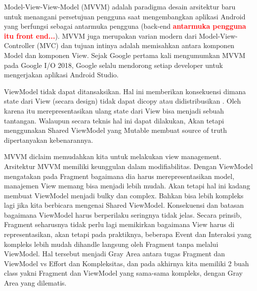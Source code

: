 \documentclass[conference]{IEEEtran}
\begin{document}
\indent Model-View-View-Model (MVVM) adalah paradigma desain arsitektur baru untuk menangani persetujuan pengguna saat mengembangkan aplikasi Android yang berfungsi sebagai antarmuka pengguna (back-end \textbf{\textcolor{red}{antarmuka pengguna itu front end...}}). MVVM juga merupakan varian modern dari Model-View-Controller (MVC) dan tujuan intinya adalah memisahkan antara komponen Model dan komponen View\cite{rasyid2022sistem}. Sejak Google pertama kali mengumumkan MVVM pada Google I/O 2018, Google selalu mendorong setiap developer untuk mengerjakan aplikasi Android Studio.\cite{maulana2022aplikasi}

\indent ViewModel tidak dapat ditansaksikan. Hal ini memberikan konsekuensi dimana state dari View (secara design) tidak dapat dicopy atau didistribusikan \cite{saputro2020implementasi}. Oleh karena itu merepresentasikan ulang state dari View bisa menjadi sebuah tantangan. Walaupun secara teknis hal ini dapat dilakukan, Akan tetapi menggunakan Shared ViewModel yang Mutable membuat source of truth dipertanyakan kebenarannya.

\indent MVVM diclaim memudahkan kita untuk melakukan view management. Arsitektur MVVM memiliki keunggulan dalam modifiabilitas\cite{anhar2024analisis}. Dengan ViewModel mengatakan pada Fragment bagaimana dia harus merepresentasikan model, manajemen View memang bisa menjadi lebih mudah. Akan tetapi hal ini kadang membuat ViewModel menjadi bulky dan complex. Bahkan bisa lebih kompleks lagi jika kita berbicara mengenai Shared ViewModel. Konsekuensi dan batasan bagaimana ViewModel harus berperilaku seringnya tidak jelas. Secara prinsib, Fragment seharusnya tidak perlu lagi memikirkan bagaimana View harus di representasikan, akan tetapi pada praktiknya, beberapa Event dan Interaksi yang kompleks lebih mudah dihandle langsung oleh Fragment tanpa melalui ViewModel. Hal tersebut menjadi Gray Area antara tugas Fragment dan ViewModel vs Effort dan Kompleksitas, dan pada akhirnya kita memiliki 2 buah class yakni Fragment dan ViewModel yang sama-sama kompleks, dengan Gray Area yang dilematis. 
\end{document}

